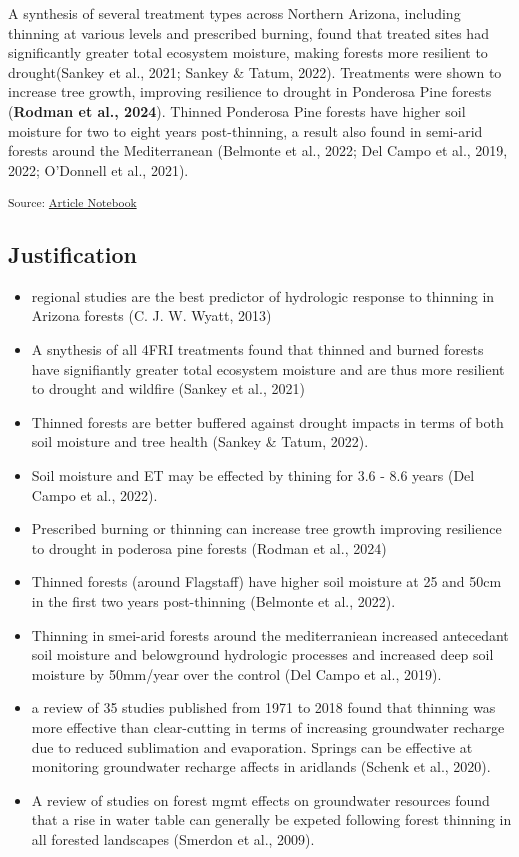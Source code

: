 \documentclass[
]{agujournal2019}
\begin{document}
A synthesis of several treatment types across Northern Arizona,
including thinning at various levels and prescribed burning, found that
treated sites had significantly greater total ecosystem moisture, making
forests more resilient to drought(Sankey et al., 2021; Sankey \& Tatum,
2022). Treatments were shown to increase tree growth, improving
resilience to drought in Ponderosa Pine forests (\textbf{Rodman et al.,
2024}). Thinned Ponderosa Pine forests have higher soil moisture for two
to eight years post-thinning, a result also found in semi-arid forests
around the Mediterranean (Belmonte et al., 2022; Del Campo et al., 2019,
2022; O'Donnell et al., 2021).

\textsubscript{Source:
\href{https://Ryan3Lima.github.io/ATUR-ForestThinning/index.ipynb.html}{Article
Notebook}}

\subsection{Justification}\label{justification}

\begin{itemize}
\item
  regional studies are the best predictor of hydrologic response to
  thinning in Arizona forests (C. J. W. Wyatt, 2013)
\item
  A snythesis of all 4FRI treatments found that thinned and burned
  forests have signifiantly greater total ecosystem moisture and are
  thus more resilient to drought and wildfire (Sankey et al., 2021)
\item
  Thinned forests are better buffered against drought impacts in terms
  of both soil moisture and tree health (Sankey \& Tatum, 2022).
\item
  Soil moisture and ET may be effected by thining for 3.6 - 8.6 years
  (Del Campo et al., 2022).
\item
  Prescribed burning or thinning can increase tree growth improving
  resilience to drought in poderosa pine forests (Rodman et al., 2024)
\item
  Thinned forests (around Flagstaff) have higher soil moisture at 25 and
  50cm in the first two years post-thinning (Belmonte et al., 2022).
\item
  Thinning in smei-arid forests around the mediterraniean increased
  antecedant soil moisture and belowground hydrologic processes and
  increased deep soil moisture by 50mm/year over the control (Del Campo
  et al., 2019).
\item
  a review of 35 studies published from 1971 to 2018 found that thinning
  was more effective than clear-cutting in terms of increasing
  groundwater recharge due to reduced sublimation and evaporation.
  Springs can be effective at monitoring groundwater recharge affects in
  aridlands (Schenk et al., 2020).
\item
  A review of studies on forest mgmt effects on groundwater resources
  found that a rise in water table can generally be expeted following
  forest thinning in all forested landscapes (Smerdon et al., 2009).
\end{itemize}
\end{document}
